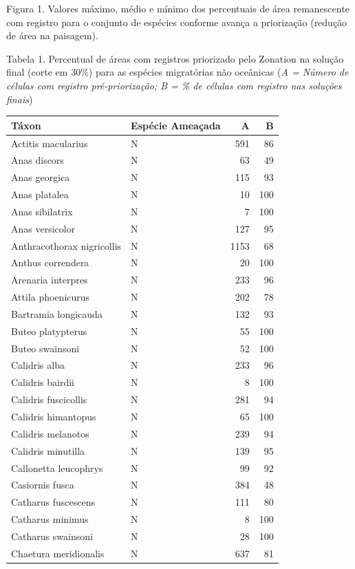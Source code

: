 \documentclass[
]{scrbook}
\begin{document}
Figura 1. Valores máximo, médio e mínimo dos percentuais de área remanescente com registro para o conjunto de espécies conforme avança a priorização (redução de área na paisagem).

Tabela 1. Percentual de áreas com registros priorizado pelo Zonation na solução final (corte em 30\%) para as espécies migratórias não oceânicas (\emph{A = Número de células com registro pré-priorização; B = \% de células com registro nas soluções finais})

\begin{table}
\centering
\begin{tabular}{llrr}
\toprule
Táxon & Espécie Ameaçada & A & B\\
\midrule
Actitis macularius & N & 591 & 86\\
Anas discors & N & 63 & 49\\
Anas georgica & N & 115 & 93\\
Anas platalea & N & 10 & 100\\
Anas sibilatrix & N & 7 & 100\\
\addlinespace
Anas versicolor & N & 127 & 95\\
Anthracothorax nigricollis & N & 1153 & 68\\
Anthus correndera & N & 20 & 100\\
Arenaria interpres & N & 233 & 96\\
Attila phoenicurus & N & 202 & 78\\
\addlinespace
Bartramia longicauda & N & 132 & 93\\
Buteo platypterus & N & 55 & 100\\
Buteo swainsoni & N & 52 & 100\\
Calidris alba & N & 233 & 96\\
Calidris bairdii & N & 8 & 100\\
\addlinespace
Calidris fuscicollis & N & 281 & 94\\
Calidris himantopus & N & 65 & 100\\
Calidris melanotos & N & 239 & 94\\
Calidris minutilla & N & 139 & 95\\
Callonetta leucophrys & N & 99 & 92\\
\addlinespace
Casiornis fusca & N & 384 & 48\\
Catharus fuscescens & N & 111 & 80\\
Catharus minimus & N & 8 & 100\\
Catharus swainsoni & N & 28 & 100\\
Chaetura meridionalis & N & 637 & 81\\

\end{tabular}
\end{table}
\end{document}
